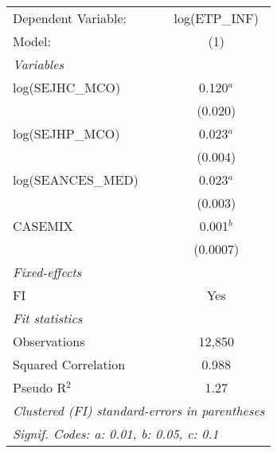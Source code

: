 
\begingroup
\centering
\begin{tabular}{lc}
   \tabularnewline \midrule \midrule
   Dependent Variable: & log(ETP\_INF)\\   
   Model:              & (1)\\  
   \midrule
   \emph{Variables}\\
   log(SEJHC\_MCO)     & 0.120$^{a}$\\   
                       & (0.020)\\   
   log(SEJHP\_MCO)     & 0.023$^{a}$\\   
                       & (0.004)\\   
   log(SEANCES\_MED)   & 0.023$^{a}$\\   
                       & (0.003)\\   
   CASEMIX             & 0.001$^{b}$\\   
                       & (0.0007)\\   
   \midrule
   \emph{Fixed-effects}\\
   FI                  & Yes\\  
   \midrule
   \emph{Fit statistics}\\
   Observations        & 12,850\\  
   Squared Correlation & 0.988\\  
   Pseudo R$^2$        & 1.27\\  
   \midrule \midrule
   \multicolumn{2}{l}{\emph{Clustered (FI) standard-errors in parentheses}}\\
   \multicolumn{2}{l}{\emph{Signif. Codes: a: 0.01, b: 0.05, c: 0.1}}\\
\end{tabular}
\par\endgroup


